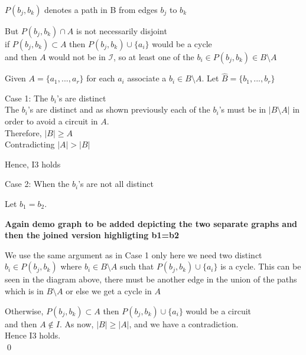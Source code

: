 \documentclass[../main.tex]{subfiles}
\begin{document}
 \vspace{2mm}
 
 \noindent\Notation $ P ( b_j, b_k ) $ denotes a path in B from edges $ b_j $ to $ b_k $
 
 \vspace{2mm}
 
\noindent But $ P(b_j,b_k) \cap A $ is not necessarily disjoint\\
\noindent if $ P(b_j,b_k) \subset A  $ then $ P(b_j,b_k) \cup \{ a_i \} $  would be a cycle\\ and then $ A$ would not be in $ \mathcal{I} $, so at least one of the $ b_i \in P(b_j,b_k) \in B \setminus A $
 
 \vspace{4mm}
 
 \noindent Given $A = \{a_1, ... ,a_r\} $ for each $a_i$ associate a $b_i \in B \setminus A$. Let $\hat{B} = \{b_1, ... ,b_r\}$
 
 \vspace{2mm}
 
 \noindent Case 1: The $ b_i$'s are distinct\\
 The $ b_i$'s are distinct and as shown previously each of the $ b_i$'s must be in $ |B \setminus A| $ in order to avoid a circuit in $ A $.\\ 
\noindent Therefore,
  $ |B| \geqslant A $ \\Contradicting $ |A|  >  |B| $
 
 \vspace{3mm}
 
\noindent Hence, I3 holds

\noindent Case 2: When the $b_i$'s are not all distinct

\noindent Let $ b_1 = b_2 $.

\textbf{Again demo graph to be added depicting the two separate graphs and then the joined version highligting b1=b2}

\noindent We use the same argument as in Case 1 only here we need two distinct $ b_i \in P( b_j, b_k) $ where $ b_i \in B \setminus A $ such that  $ P(b_j , b_k ) \cup \{ a_i \} $ is a cycle. This can be seen in the diagram above, there must be another edge in the union of the paths which is in $ B \setminus A$ or else we get a cycle in $A$

\vspace{2mm}

\noindent Otherwise, $ P(b_j,b_k) \subset A  $ then $ P(b_j,b_k) \cup \{ a_i \} $  would be a circuit\\ and then $ A \notin I $. As now, $ |B| \geq |A| $, and we have a contradiction.\\
\noindent Hence I3 holds.\\
\qed
 
\end{document}
